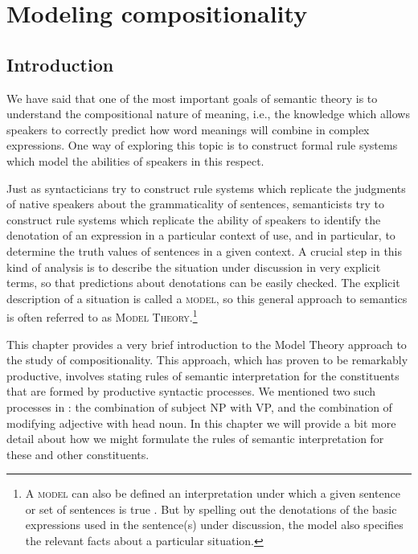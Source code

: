\chapter{Modeling compositionality}\label{sec:13}

\section{Introduction}\label{sec:13.1}

We have said that one of the most important goals of semantic theory is to understand the compositional nature of meaning, i.e., the knowledge which allows speakers to correctly predict how word meanings will combine in complex expressions. One way of exploring this topic is to construct formal rule systems which model the abilities of speakers in this respect.



Just as syntacticians try to construct rule systems which replicate the judgments of native speakers about the grammaticality of sentences, semanticists try to construct rule systems which replicate the ability of speakers to identify the denotation of an expression in a particular context of use, and in particular, to determine the truth values of sentences in a given context. A crucial step in this kind of analysis is to describe the situation under discussion in very explicit terms, so that predictions about denotations can be easily checked. The explicit description of a situation is called a \textsc{model}, so this general approach to semantics is often referred to as \textsc{Model Theory}.\footnote{A \textsc{model} can also be defined an interpretation under which a given sentence or set of sentences is true \citep{Hodge2013}. But by spelling out the denotations of the basic expressions used in the sentence(s) under discussion, the model also specifies the relevant facts about a particular situation.}



This chapter provides a very brief introduction to the Model Theory approach to the study of compositionality. This approach, which has proven to be remarkably productive, involves stating rules of semantic interpretation for the constituents that are formed by productive syntactic processes. We mentioned two such processes in : the combination of subject NP with VP, and the combination of modifying adjective with head noun. In this chapter we will provide a bit more detail about how we might formulate the rules of semantic interpretation for these and other constituents.



